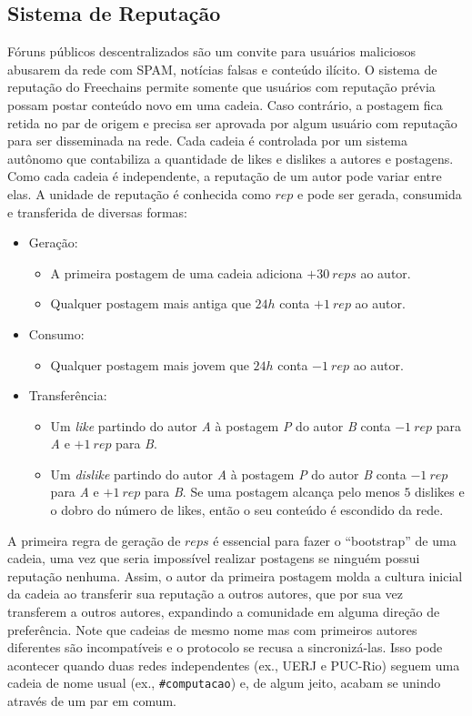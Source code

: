 \documentclass[12pt]{article}
\newcommand{\FC} {Freechains\xspace}
\begin{document}
\subsection{Sistema de Reputação}

Fóruns públicos descentralizados são um convite para usuários maliciosos
abusarem da rede com SPAM, notícias falsas e conteúdo ilícito.
O sistema de reputação do \FC permite somente que usuários com reputação prévia
possam postar conteúdo novo em uma cadeia.
Caso contrário, a postagem fica retida no par de origem e precisa ser aprovada
por algum usuário com reputação para ser disseminada na rede.
Cada cadeia é controlada por um sistema autônomo que contabiliza a quantidade
de likes e dislikes a autores e postagens.
Como cada cadeia é independente, a reputação de um autor pode variar entre
elas.
A unidade de reputação é conhecida como $rep$ e pode ser gerada, consumida e
transferida de diversas formas:
%
\begin{itemize}
\item Geração:
    \begin{itemize}
    \item A primeira postagem de uma cadeia adiciona $+30~reps$ ao autor.
    \item Qualquer postagem mais antiga que $24h$ conta $+1~rep$ ao autor.
    \end{itemize}
\item Consumo:
    \begin{itemize}
    \item Qualquer postagem mais jovem que $24h$ conta $-1~rep$ ao autor.
    \end{itemize}
\item Transferência:
    \begin{itemize}
    \item Um \emph{like}    partindo do autor \emph{A} à postagem \emph{P} do
          autor \emph{B} conta $-1~rep$ para \emph{A} e $+1~rep$ para \emph{B}.
    \item Um \emph{dislike} partindo do autor \emph{A} à postagem \emph{P} do
          autor \emph{B} conta $-1~rep$ para \emph{A} e $+1~rep$ para \emph{B}.
          Se uma postagem alcança pelo menos $5$ dislikes e o dobro do número
          de likes, então o seu conteúdo é escondido da rede.
    \end{itemize}
\end{itemize}
%
A primeira regra de geração de $reps$ é essencial para fazer o ``bootstrap'' de
uma cadeia, uma vez que seria impossível realizar postagens se ninguém possui
reputação nenhuma.
Assim, o autor da primeira postagem molda a cultura inicial da cadeia ao
transferir sua reputação a outros autores, que por sua vez transferem a outros
autores, expandindo a comunidade em alguma direção de preferência.
%
Note que cadeias de mesmo nome mas com primeiros autores diferentes são
incompatíveis e o protocolo se recusa a sincronizá-las.
Isso pode acontecer quando duas redes independentes (ex., UERJ e PUC-Rio)
seguem uma cadeia de nome usual (ex., \texttt{\#computacao}) e, de algum jeito,
acabam se unindo através de um par em comum.
\end{document}
